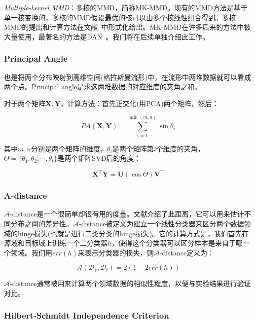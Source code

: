 \textit{Multiple-kernel MMD}：多核的MMD，简称MK-MMD。现有的MMD方法是基于单一核变换的，多核的MMD假设最优的核可以由多个核线性组合得到。多核MMD的提出和计算方法在文献~\cite{gretton2012optimal}中形式化给出。MK-MMD在许多后来的方法中被大量使用，最著名的方法是DAN~\cite{long2015learning}。我们将在后续单独介绍此工作。

\subsubsection{Principal Angle}

也是将两个分布映射到高维空间(格拉斯曼流形)中，在流形中两堆数据就可以看成两个点。Principal angle是求这两堆数据的对应维度的夹角之和。

对于两个矩阵$\mathbf{X},\mathbf{Y}$，计算方法：首先正交化(用PCA)两个矩阵，然后：

\begin{equation}
\label{eq-dist-pa}
PA(\mathbf{X},\mathbf{Y})=\sum_{i=1}^{\min(m,n)} \sin \theta_i
\end{equation}

其中$m,n$分别是两个矩阵的维度，$\theta_i$是两个矩阵第$i$个维度的夹角，$\Theta=\{\theta_1,\theta_2,\cdots,\theta_t\}$是两个矩阵SVD后的角度：

\begin{equation}
	\mathbf{X}^\top\mathbf{Y}=\mathbf{U} (\cos \Theta) \mathbf{V}^\top
\end{equation}

\subsubsection{A-distance}

$\mathcal{A}$-distance是一个很简单却很有用的度量。文献\cite{ben2007analysis}介绍了此距离，它可以用来估计不同分布之间的差异性。$\mathcal{A}$-distance被定义为建立一个线性分类器来区分两个数据领域的hinge损失(也就是进行二类分类的hinge损失)。它的计算方式是，我们首先在源域和目标域上训练一个二分类器$h$，使得这个分类器可以区分样本是来自于哪一个领域。我们用$err(h)$来表示分类器的损失，则$\mathcal{A}$-distance定义为：

\begin{equation}
	\label{eq-dist-adist}
	\mathcal{A}(\mathcal{D}_s,\mathcal{D}_t) = 2(1 - 2 err(h))
\end{equation}

$\mathcal{A}$-distance通常被用来计算两个领域数据的相似性程度，以便与实验结果进行验证对比。

\subsubsection{Hilbert-Schmidt Independence Criterion}

